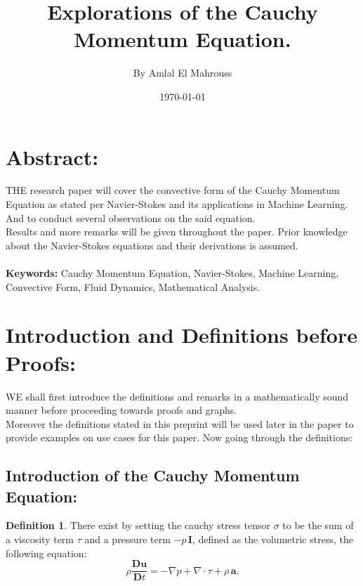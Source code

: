\documentclass[10pt]{article}
\title{%
	\vspace{-1.5em}%
	\large\textbf{Explorations of the Cauchy Momentum Equation.}%
}
\author{By Amlal El Mahrouss}
\date{\today}
\theoremstyle{plain}
\theoremstyle{definition}
\newtheorem{definition}[theorem]{Definition}
\theoremstyle{remark}
\begin{document}

\maketitle
\tableofcontents
\newpage

\section{Abstract:}

\lettrine[lines=1, lhang=0.1, loversize=0.2]{T}HE research paper will cover the convective form of the Cauchy Momentum Equation as stated per Navier-Stokes and its applications in Machine Learning. And to conduct several observations on the said equation.\\
Results and more remarks will be given throughout the paper. Prior knowledge about the Navier-Stokes equations and their derivations is assumed.\\ \\
\textbf{Keywords:} Cauchy Momentum Equation, Navier-Stokes, Machine Learning, Convective Form, Fluid Dynamics, Mathematical Analysis.

\section{Introduction and Definitions before Proofs:}

\lettrine[lines=1, lhang=0.1, loversize=0.2]{W}E shall first introduce the definitions and remarks in a mathematically sound manner before proceeding towards proofs and graphs.\\Moreover the definitions stated in this preprint will be used later in the paper to provide examples on use cases for this paper. Now going through the definitions:
\subsection{Introduction of the Cauchy Momentum Equation:}
\begin{definition}
There exist by setting the cauchy stress tensor $\sigma$ to be the sum of a viscosity term $\tau$ and a pressure term $-p\, \mathbf{I}$, defined as the volumetric stress, the following equation:
\begin{equation}
\label{eq:cauchy}
  \rho \frac{\mathbf{D}\textbf{u}}{\mathbf{D}t} = - \nabla p + \nabla \cdot \tau + \rho \, \textbf{a}.
\end{equation}
\end{definition}
\end{document}

